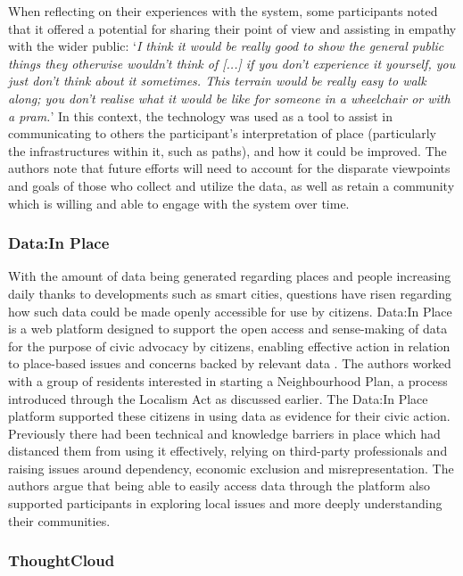 When reflecting on their experiences with the system, some participants noted that it offered a potential for sharing their point of view and assisting in empathy with the wider public: `\textit{I think it would be really good to show the general public things they otherwise wouldn't think of [...] if you don't experience it yourself, you just don't think about it sometimes. This terrain would be really easy to walk along; you don't realise what it would be like for someone in a wheelchair or with a pram.}' In this context, the technology was used as a tool to assist in communicating to others the participant's interpretation of place (particularly the infrastructures within it, such as paths), and how it could be improved. The authors note that future efforts will need to account for the disparate viewpoints and goals of those who collect and utilize the data, as well as retain a community which is willing and able to engage with the system over time.

\subsubsection{Data:In Place}
With the amount of data being generated regarding places and people increasing daily thanks to developments such as smart cities, questions have risen regarding how such data could be made openly accessible for use by citizens. Data:In Place is a web platform designed to support the open access and sense-making of data for the purpose of civic advocacy by citizens, enabling effective action in relation to place-based issues and concerns backed by relevant data \citep{Puussaar2018}. The authors worked with a group of residents interested in starting a Neighbourhood Plan, a process introduced through the Localism Act as discussed earlier. The Data:In Place platform supported these citizens in using data as evidence for their civic action. Previously there had been technical and knowledge barriers in place which had distanced them from using it effectively, relying on third-party professionals and raising issues around dependency, economic exclusion and misrepresentation. The authors argue that being able to easily access data through the platform also supported participants in exploring local issues and more deeply understanding their communities.

\subsubsection{ThoughtCloud}

